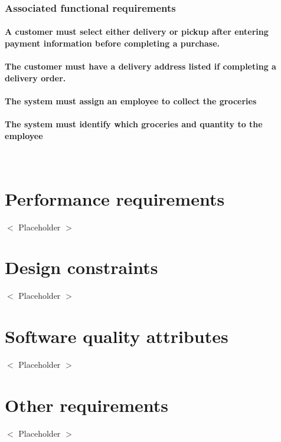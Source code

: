 \documentclass{scrreprt}
\theoremstyle{funreq}
\begin{document}
	\subsubsection{Associated functional requirements}
	
	\paragraph[]{\normalfont A customer must select either delivery or pickup after entering payment information before completing a purchase.}
	
	\paragraph[]{\normalfont The customer must have a delivery address listed if completing a delivery order.}
	\paragraph[]{\normalfont The system must assign an employee to collect the groceries}
	\paragraph[]{\normalfont The system must identify which groceries and quantity to the employee}
	~\\
	
	
	\section{Performance requirements}
	$<$ Placeholder $>$
	
	\section{Design constraints}
	$<$ Placeholder $>$
	
	
	\section{Software quality attributes}
	$<$ Placeholder $>$
	
	\section{Other requirements}
	$<$ Placeholder $>$
	
\end{document}
